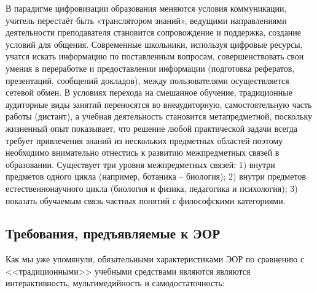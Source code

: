 В парадигме цифровизации образования меняются условия коммуникации, учитель перестаёт быть «транслятором знаний», ведущими направлениями деятельности преподавателя становится сопровождение и поддержка, создание условий для общения.
Современные школьники, используя цифровые ресурсы, учатся искать информацию по поставленным вопросам, совершенствовать свои умения в переработке и предоставлении информации (подготовка рефератов, презентаций, сообщений докладов), между пользователями осуществляется сетевой обмен\cite{shevardina}.
В условиях перехода на смешанное обучение, традиционные аудиторные виды занятий переносятся во внеаудиторную, самостоятельную часть работы (дистант), а учебная деятельность становится метапредметной, поскольку жизненный опыт показывает, что решение любой практической задачи всегда требует привлечения знаний из нескольких предметных областей поэтому необходимо внимательно отнестись к развитию межпредметных связей в образовании\cite{metapredmet}.
Существует три уровня межпредметных связей: 1) внутри предметов одного цикла (например, ботаника -- биология); 2) внутри предметов естественнонаучного цикла (биология и физика, педагогика и психология); 3) показать обучаемым связь частных понятий с философскими категориями.




\large
\subsection{Требования, предъявляемые к ЭОР}
Как мы уже упомянули, обязательными характеристиками ЭОР по сравнению с <<традиционными>> учебными средствами являются  являются интерактивность, мультимедийность и самодостаточность: 

